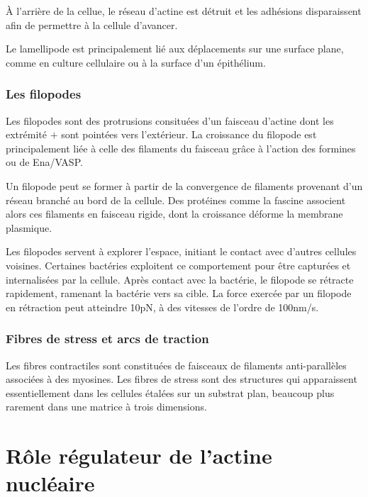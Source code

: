 À l'arrière de la cellue, le réseau d'actine est détruit et les adhésions disparaissent afin de permettre à la cellule d'avancer. 

Le lamellipode est principalement lié aux déplacements sur une surface plane, comme en culture cellulaire ou à la surface d'un épithélium. 


\subsubsection{Les filopodes}

Les filopodes sont des protrusions consituées d'un faisceau d'actine dont les extrémité $+$ sont pointées vers l'extérieur. 
La croissance du filopode est principalement liée à celle des filaments du faisceau grâce à l'action des formines ou de Ena/VASP. 

Un filopode peut se former à partir de la convergence de filaments provenant d'un réseau branché au bord de la cellule. 
Des protéines comme la fascine associent alors ces filaments en faisceau rigide, dont la croissance déforme la membrane plasmique. 

Les filopodes servent à explorer l'espace, initiant le contact avec d'autres cellules voisines. 
Certaines bactéries exploitent ce comportement pour être capturées et internalisées par la cellule. 
Après contact avec la bactérie, le filopode se rétracte rapidement, ramenant la bactérie vers sa cible.
La force exercée par un filopode en rétraction peut atteindre 10pN, à des vitesses de l'ordre de 100nm/s. 



\subsubsection{Fibres de stress et arcs de traction}

Les fibres contractiles sont constituées de faisceaux de filaments anti-parallèles associées à des myosines. 
Les fibres de stress sont des structures qui apparaissent essentiellement dans les cellules étalées sur un substrat plan, beaucoup plus rarement dans une matrice à trois dimensions. 

\section{Rôle régulateur de l'actine nucléaire}

